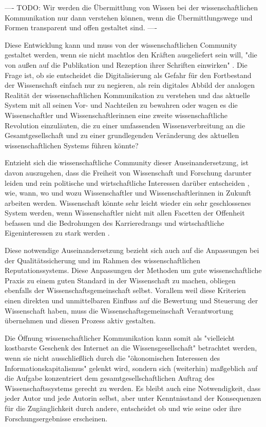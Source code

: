 ---- TODO: Wir werden die Übermittlung von Wissen bei der wissenschaftlichen Kommunikation nur dann verstehen können, wenn die Übermittlungswege und Formen transparent und offen gestaltet sind. \cite{davis_2011_open} ----

Diese Entwicklung kann und muss von der wissenschaftlichen Community gestaltet werden, wenn sie nicht machtlos den Kräften ausgeliefert sein will, "die von außen auf die Publikation und Rezeption ihrer Schriften einwirken" \cite{Hirschi_2015_buch_oa}. Die Frage ist, ob sie entscheidet die Digitalisierung als Gefahr für den Fortbestand der Wissenschaft einfach nur zu negieren, als rein digitales Abbild der analogen Realität der wissenschaftlichen Kommunikation zu verstehen und das aktuelle System mit all seinen Vor- und Nachteilen zu bewahren oder wagen es die Wissenschaftler und Wissenschaftlerinnen eine zweite wissenschaftliche Revolution einzuläuten, die zu einer umfassenden Wissensverbreitung an die Gesamtgesellschaft und zu einer grundlegenden Veränderung des aktuellen wissenschaftlichen Systems führen könnte?

Entzieht sich die wissenschaftliche Community dieser Auseinandersetzung, ist davon auszugehen, dass die Freiheit von Wissenschaft und Forschung darunter leiden und rein politische und wirtschaftliche Interessen darüber entscheiden \cite{Warnke_2012}, wie, wann, wo und wozu Wissenschaftler und Wissenschaftlerinnen in Zukunft arbeiten werden. Wissenschaft könnte sehr leicht wieder ein sehr geschlossenes System werden, wenn Wissenschaftler nicht mit allen Facetten der Offenheit befassen und die Bedrohungen des Karrieredrangs und wirtschaftliche Eigeninteressen zu stark werden \cite{resnik_2005_ethics}.

Diese notwendige Auseinandersetzung bezieht sich auch auf die Anpassungen bei der Qualitätssicherung und im Rahmen des wissenschaftlichen Reputationssystems. Diese Anpassungen der Methoden um gute wissenschaftliche Praxis zu einem guten Standard in der Wissenschaft zu machen, obliegen ebenfalls der Wissenschaftsgemeinschaft selbst. Vorallem weil diese Kriterien einen direkten und unmittelbaren Einfluss auf die Bewertung und Steuerung der Wissenschaft haben, muss die Wissenschaftsgemeinschaft Verantwortung übernehmen und diesen Prozess aktiv gestalten.

Die Öffnung wissenschaftlicher Kommunikation kann somit als "vielleicht kostbarste Geschenk des Internet an die Wissensgesellschaft" betrachtet werden, wenn sie nicht ausschließlich durch die "ökonomischen Interessen des Informationskapitalismus" \cite{hagner_2015_sache_buches} gelenkt wird, sondern sich (weiterhin) maßgeblich auf die Aufgabe konzentriert dem gesamtgesellschaftlichen Auftrag des Wissenschaftssystems gerecht zu werden. Es bleibt auch eine Notwendigkeit, dass jeder Autor und jede Autorin selbst, aber unter Kenntnisstand der Konsequenzen für die Zugänglichkeit durch andere, entscheidet ob und wie seine oder ihre Forschungsergebnisse erscheinen.

